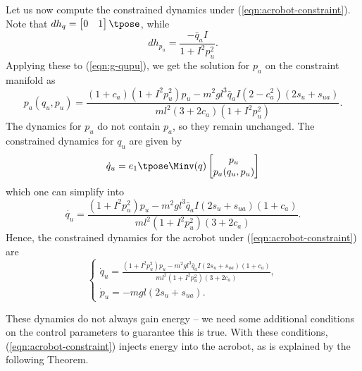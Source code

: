 Let us now compute the constrained dynamics under
(\ref{eqn:acrobot-constraint}).
Note that \(dh_q = \begin{bmatrix}0 & 1\end{bmatrix}\tpose\), while
\[
    dh_{p_u} = \frac{-\bar{q}_a I}{1 + I^2 p_u^2}
    .
\]
Applying these to (\ref{eqn:g-qupu}), we get the solution for \(p_a\) on the
constraint manifold as
\[
    p_a(q_u,p_u) = \frac{
        (1+c_a)(1+I^2 p_u^2)p_u - m^2gl^3\bar{q}_a I (2-c_a^2)(2s_u + s_{ua})
    }{ml^2(3+2c_a)(1+I^2 p_u^2)}
    .
\]
The dynamics for \(p_u\) do not contain \(p_a\), so they remain unchanged.
The constrained dynamics for \(q_u\) are given by 
\begin{equation*}
    \dot{q}_u = e_1\tpose \Minv(q) \begin{bmatrix}
                    p_u \\ p_a(q_u,p_u)
                \end{bmatrix} %
\end{equation*}
which one can simplify into 
\begin{equation*}
    \dot{q_u} = \frac{(1+I^2 p_u^2)p_u - m^2gl^3\bar{q}_a I(2s_u + s_{ua})(1+c_a) }{ml^2(1+I^2 p_u^2)(3+2c_a)}
    .
\end{equation*}
Hence, the constrained dynamics for the acrobot under
(\ref{eqn:acrobot-constraint}) are
\begin{equation}\label{eqn:acrobot-constrained-dynamics}
    \begin{cases}
        \dot{q}_u = \frac{(1+I^2 p_u^2)p_u - m^2gl^3\bar{q}_a I(2s_u + s_{ua})(1+c_a) }
            {ml^2(1+I^2 p_u^2)(3+2c_a)}
        , \\
        \dot{p}_u = - m g l (2s_u + s_{ua})
        .
    \end{cases}
\end{equation}

These dynamics do not always gain energy -- we need some additional conditions
on the control parameters to guarantee this is true. 
With these conditions, (\ref{eqn:acrobot-constraint}) injects energy into the
acrobot, as is explained by the following Theorem.

